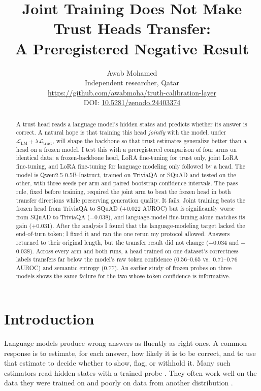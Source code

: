 \documentclass[11pt]{article}
\title{Joint Training Does Not Make Trust Heads Transfer:\\A Preregistered Negative Result}
\author{Awab Mohamed \\
  Independent researcher, Qatar \\
  \url{https://github.com/awabmoha/truth-calibration-layer} \\
  DOI: \href{https://doi.org/10.5281/zenodo.24403374}{10.5281/zenodo.24403374}}
\newcommand{\Ltrust}{\mathcal{L}_{\text{trust}}}
\newcommand{\LLM}{\mathcal{L}_{\text{LM}}}
\begin{document}
\maketitle

\begin{abstract}
A trust head reads a language model's hidden states and predicts whether its answer is correct. A natural hope is that training this head \emph{jointly} with the model, under $\LLM + \lambda \Ltrust$, will shape the backbone so that trust estimates generalize better than a head on a frozen model. I test this with a preregistered comparison of four arms on identical data: a frozen-backbone head, LoRA fine-tuning for trust only, joint LoRA fine-tuning, and LoRA fine-tuning for language modeling only followed by a head. The model is Qwen2.5-0.5B-Instruct, trained on TriviaQA or SQuAD and tested on the other, with three seeds per arm and paired bootstrap confidence intervals. The pass rule, fixed before training, required the joint arm to beat the frozen head in both transfer directions while preserving generation quality. It fails. Joint training beats the frozen head from TriviaQA to SQuAD (+0.022 AUROC) but is significantly worse from SQuAD to TriviaQA ($-$0.038), and language-model fine-tuning alone matches its gain (+0.031). After the analysis I found that the language-modeling target lacked the end-of-turn token; I fixed it and ran the one rerun my protocol allowed. Answers returned to their original length, but the transfer result did not change (+0.034 and $-$0.038). Across every arm and both runs, a head trained on one dataset's correctness labels transfers far below the model's raw token confidence (0.56--0.65 vs.\ 0.71--0.76 AUROC) and semantic entropy (0.77). An earlier study of frozen probes on three models shows the same failure for the two whose token confidence is informative.
\end{abstract}

\section{Introduction}

Language models produce wrong answers as fluently as right ones. A common response is to estimate, for each answer, how likely it is to be correct, and to use that estimate to decide whether to show, flag, or withhold it. Many such estimators read hidden states with a trained probe \citep{azaria-mitchell-2023-internal,marks2024geometry,orgad2025llms}. They often work well on the data they were trained on and poorly on data from another distribution \citep{orgad2025llms}.
\end{document}
